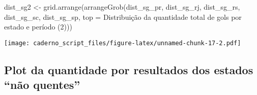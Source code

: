\documentclass[
]{article}
\newenvironment{Shaded}{\begin{snugshade}}{\end{snugshade}}
\newcommand{\AttributeTok}[1]{\textcolor[rgb]{0.77,0.63,0.00}{#1}}
\newcommand{\FunctionTok}[1]{\textcolor[rgb]{0.00,0.00,0.00}{#1}}
\newcommand{\NormalTok}[1]{#1}
\newcommand{\OtherTok}[1]{\textcolor[rgb]{0.56,0.35,0.01}{#1}}
\newcommand{\StringTok}[1]{\textcolor[rgb]{0.31,0.60,0.02}{#1}}
\begin{document}
\begin{Shaded}
\begin{Highlighting}[]
\NormalTok{dist\_sg2 }\OtherTok{\textless{}{-}} \FunctionTok{grid.arrange}\NormalTok{(}\FunctionTok{arrangeGrob}\NormalTok{(dist\_sg\_pr, dist\_sg\_rj, dist\_sg\_rs,}
\NormalTok{                         dist\_sg\_sc, dist\_sg\_sp, }
                         \AttributeTok{top =} \StringTok{\textquotesingle{}Distribuição da quantidade total de gols por estado e período (2)\textquotesingle{}}\NormalTok{))}
\end{Highlighting}
\end{Shaded}

\texttt{[image: caderno\_script\_files/figure-latex/unnamed-chunk-17-2.pdf]}

\hypertarget{plot-da-quantidade-por-resultados-dos-estados-nuxe3o-quentes}{%
\subsection{Plot da quantidade por resultados dos estados ``não
quentes''}\label{plot-da-quantidade-por-resultados-dos-estados-nuxe3o-quentes}}
\end{document}
